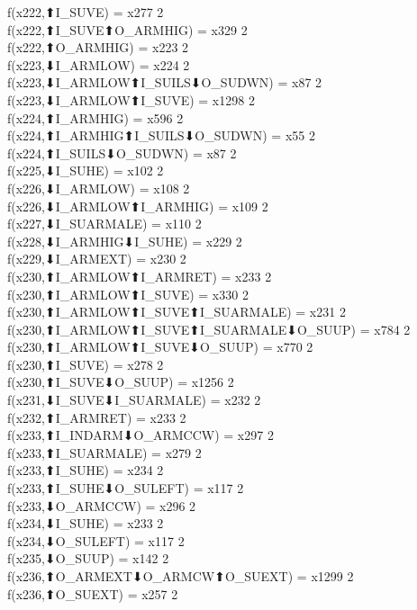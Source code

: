 f(x222,⬆I_SUVE) = x277 {2} \\
f(x222,⬆I_SUVE⬆O_ARMHIG) = x329 {2} \\
f(x222,⬆O_ARMHIG) = x223 {2} \\
f(x223,⬇I_ARMLOW) = x224 {2} \\
f(x223,⬇I_ARMLOW⬆I_SUILS⬇O_SUDWN) = x87 {2} \\
f(x223,⬇I_ARMLOW⬆I_SUVE) = x1298 {2} \\
f(x224,⬆I_ARMHIG) = x596 {2} \\
f(x224,⬆I_ARMHIG⬆I_SUILS⬇O_SUDWN) = x55 {2} \\
f(x224,⬆I_SUILS⬇O_SUDWN) = x87 {2} \\
f(x225,⬇I_SUHE) = x102 {2} \\
f(x226,⬇I_ARMLOW) = x108 {2} \\
f(x226,⬇I_ARMLOW⬆I_ARMHIG) = x109 {2} \\
f(x227,⬇I_SUARMALE) = x110 {2} \\
f(x228,⬇I_ARMHIG⬇I_SUHE) = x229 {2} \\
f(x229,⬇I_ARMEXT) = x230 {2} \\
f(x230,⬆I_ARMLOW⬆I_ARMRET) = x233 {2} \\
f(x230,⬆I_ARMLOW⬆I_SUVE) = x330 {2} \\
f(x230,⬆I_ARMLOW⬆I_SUVE⬆I_SUARMALE) = x231 {2} \\
f(x230,⬆I_ARMLOW⬆I_SUVE⬆I_SUARMALE⬇O_SUUP) = x784 {2} \\
f(x230,⬆I_ARMLOW⬆I_SUVE⬇O_SUUP) = x770 {2} \\
f(x230,⬆I_SUVE) = x278 {2} \\
f(x230,⬆I_SUVE⬇O_SUUP) = x1256 {2} \\
f(x231,⬇I_SUVE⬇I_SUARMALE) = x232 {2} \\
f(x232,⬆I_ARMRET) = x233 {2} \\
f(x233,⬆I_INDARM⬇O_ARMCCW) = x297 {2} \\
f(x233,⬆I_SUARMALE) = x279 {2} \\
f(x233,⬆I_SUHE) = x234 {2} \\
f(x233,⬆I_SUHE⬇O_SULEFT) = x117 {2} \\
f(x233,⬇O_ARMCCW) = x296 {2} \\
f(x234,⬇I_SUHE) = x233 {2} \\
f(x234,⬇O_SULEFT) = x117 {2} \\
f(x235,⬇O_SUUP) = x142 {2} \\
f(x236,⬆O_ARMEXT⬇O_ARMCW⬆O_SUEXT) = x1299 {2} \\
f(x236,⬆O_SUEXT) = x257 {2} \\
